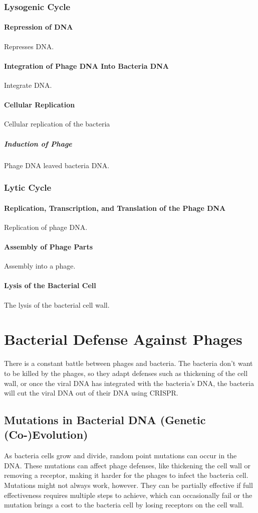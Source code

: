 \subsubsection{Lysogenic Cycle}
\paragraph{Repression of DNA}
Represses DNA. 
\paragraph{Integration of Phage DNA Into Bacteria DNA}
Integrate DNA. 
\paragraph{Cellular Replication}
Cellular replication of the bacteria
\subparagraph{Induction of Phage}
Phage DNA leaved bacteria DNA. 

\subsubsection{Lytic Cycle}
\paragraph{Replication, Transcription, and Translation of the Phage DNA}
Replication of phage DNA. 
\paragraph{Assembly of Phage Parts}
Assembly into a phage. 
\paragraph{Lysis of the Bacterial Cell}
The lysis of the bacterial cell wall. 


\section{Bacterial Defense Against Phages} 
There is a constant battle between phages and bacteria. 
The bacteria don't want to be killed by the phages, so they adapt defenses such as thickening of the cell wall, or once the viral DNA has integrated with the bacteria's DNA, the bacteria will cut the viral DNA out of their DNA using CRISPR. 
\cite{iglerPhenotypicFluxRole2022}

\subsection{Mutations in Bacterial DNA (Genetic (Co-)Evolution)}
As bacteria cells grow and divide, random point mutations can occur in the DNA. 
These mutations can affect phage defenses, like thickening the cell wall or removing a receptor, making it harder for the phages to infect the bacteria cell. 
Mutations might not always work, however. 
They can be partially effective if full effectiveness requires multiple steps to achieve, which can occasionally fail \cite{lenskiTWOSTEPRESISTANCEESCHERICHIA1984} or the mutation brings a cost to the bacteria cell by losing receptors on the cell wall. \newline

